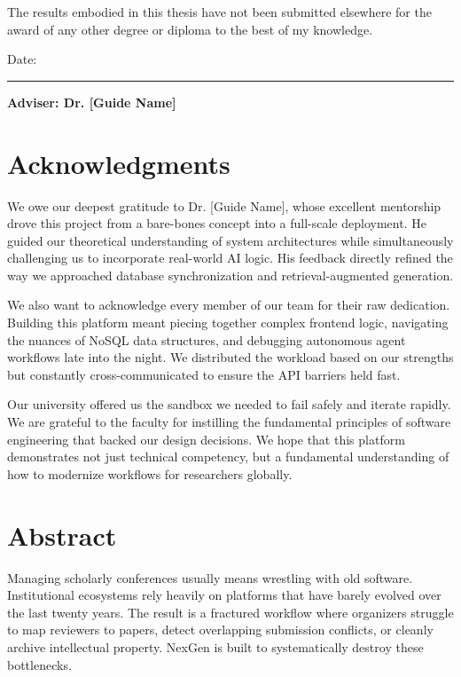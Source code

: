 \documentclass[12pt,a4paper]{report}
\begin{document}
The results embodied in this thesis have not been submitted elsewhere for the award of any other degree or diploma to the best of my knowledge.

\vspace{3cm}

\noindent Date: \rule{4cm}{0.4pt} \hfill \textbf{Adviser: Dr. [Guide Name]}

\newpage

\chapter*{Acknowledgments}
We owe our deepest gratitude to Dr. [Guide Name], whose excellent mentorship drove this project from a bare-bones concept into a full-scale deployment. He guided our theoretical understanding of system architectures while simultaneously challenging us to incorporate real-world AI logic. His feedback directly refined the way we approached database synchronization and retrieval-augmented generation.

We also want to acknowledge every member of our team for their raw dedication. Building this platform meant piecing together complex frontend logic, navigating the nuances of NoSQL data structures, and debugging autonomous agent workflows late into the night. We distributed the workload based on our strengths but constantly cross-communicated to ensure the API barriers held fast. 

Our university offered us the sandbox we needed to fail safely and iterate rapidly. We are grateful to the faculty for instilling the fundamental principles of software engineering that backed our design decisions. We hope that this platform demonstrates not just technical competency, but a fundamental understanding of how to modernize workflows for researchers globally.

\newpage

\chapter*{Abstract}
Managing scholarly conferences usually means wrestling with old software. Institutional ecosystems rely heavily on platforms that have barely evolved over the last twenty years. The result is a fractured workflow where organizers struggle to map reviewers to papers, detect overlapping submission conflicts, or cleanly archive intellectual property. NexGen is built to systematically destroy these bottlenecks.
\end{document}
